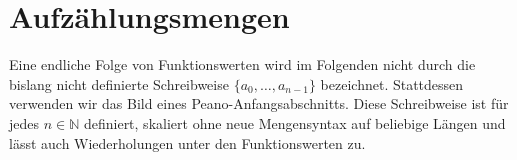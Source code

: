 \documentclass[main.tex]{subfiles}
\begin{document}
\section{Aufz\"ahlungsmengen}

Eine endliche Folge von Funktionswerten wird im Folgenden nicht durch die
bislang nicht definierte Schreibweise
\(\{a_0,\ldots,a_{n-1}\}\) bezeichnet. Stattdessen verwenden wir das Bild
eines Peano-Anfangsabschnitts. Diese Schreibweise ist f\"ur jedes
\(n\in\mathbb N\) definiert, skaliert ohne neue Mengensyntax auf beliebige
L\"angen und l\"asst auch Wiederholungen unter den Funktionswerten zu.


\begin{tabproofwide}
\end{tabproofwide}
\end{document}
